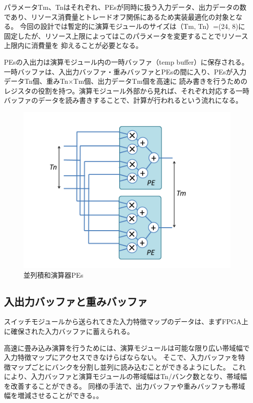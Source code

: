 パラメータTm、Tnはそれぞれ、PEsが同時に扱う入力データ、出力データの数であり、リソース消費量とトレードオフ関係にあるため実装最適化の対象となる。
今回の設計では暫定的に演算モジュールのサイズは（Tm, Tn）=(24, 8)に固定したが、リソース上限によってはこのパラメータを変更することでリソース上限内に消費量を
抑えることが必要となる。

PEsの入出力は演算モジュール内の一時バッファ（temp buffer）に保存される。一時バッファは、入出力バッファ・重みバッファとPEsの間に入り、PEsが入力データTn個、重みTn×Tm個、出力データTm個を高速に
読み書きを行うためのレジスタの役割を持つ。演算モジュール外部から見れば、それぞれ対応する一時バッファのデータを読み書きすることで、計算が行われるという流れになる。

\begin{figure}[ht]  
 \begin{center}   
   \includegraphics[width=1.0\columnwidth, bb=0 0 720 540]{img/pe.png}
  \caption{並列積和演算器PEs}
  \label{pe}  
 \end{center}  
\end{figure}
 
\subsection{入出力バッファと重みバッファ}
スイッチモジュールから送られてきた入力特徴マップのデータは、まずFPGA上に確保された入力バッファに蓄えられる。

高速に畳み込み演算を行うためには、演算モジュールは可能な限り広い帯域幅で入力特徴マップにアクセスできなけらばならない。
そこで、入力バッファを特徴マップごとにバンクを分割し並列に読み込むことができるようにした。
これにより、入力バッファと演算モジュールの帯域幅はTn/バンク数となり、帯域幅を改善することができる。
同様の手法で、出力バッファや重みバッファも帯域幅を増減させることができる。。

